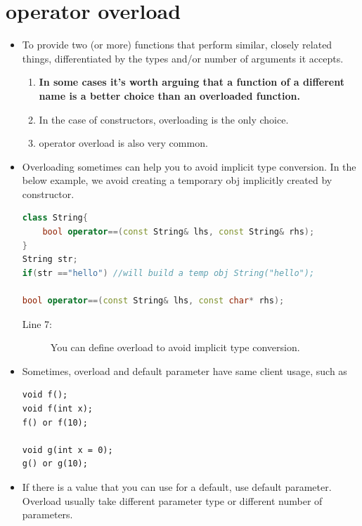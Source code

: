 \documentclass[a4paper,11pt,twoside]{book}
\begin{document}
\section{operator overload}
\begin{itemize}
	
 
	\item To provide two (or more) functions that perform similar, closely related things, differentiated by the types and/or number of arguments it accepts.
	
	\begin{enumerate}
		\item \textbf{In some cases it's worth arguing that a function of a different name is a better choice than an overloaded function.}
		
		\item  In the case of constructors, overloading is the only choice.
		
		\item  operator overload is also very common.
	\end{enumerate}


	
	\item Overloading sometimes can help you to avoid implicit type conversion. In the below example, we avoid creating a temporary obj implicitly created by constructor.
	
\begin{lstlisting}[frame=single, language=c++]
class String{
	bool operator==(const String& lhs, const String& rhs);
}
String str;
if(str =="hello") //will build a temp obj String("hello");
	
bool operator==(const String& lhs, const char* rhs);
\end{lstlisting}
\begin{description}
	\item[Line 7:] You can define overload to avoid implicit type conversion.
\end{description}

	
	\item Sometimes, overload and default parameter have same client usage, such as
\begin{lstlisting}[numbers=none]
void f();
void f(int x);
f() or f(10);
	
void g(int x = 0);
g() or g(10);
\end{lstlisting}
	
	\item If there is a value that you can use for a default, use default parameter. Overload usually take different parameter type or different number of parameters.
	

\end{itemize}
\end{document}
